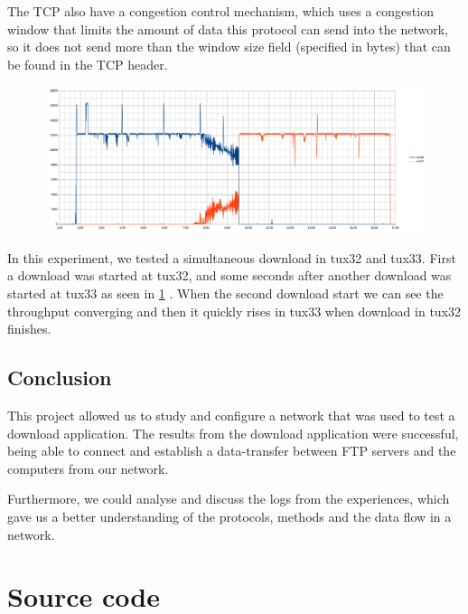 \documentclass[a4paper, 11pt]{report}
\begin{document}
The TCP also have a congestion control mechanism, which uses a congestion window that limits the amount of data this protocol can send into the network, 
so it does not send more than the window size field (specified in bytes) that can be found in the TCP header. 

\begin{figure}
    \includegraphics[width=\linewidth]{exp6_item5_hist.png}
    \caption{}
    \label{fig:exp6_item5}
\end{figure}

In this experiment, we tested a simultaneous download in tux32 and tux33. First a download was started at tux32, and some seconds after another download was started at tux33 as seen in \ref{fig:exp6_item5} .
When the second download start we can see the throughput converging and then it quickly rises in tux33 when download in tux32 finishes.

\section*{Conclusion} \label{sec:Conclusion}

This project allowed us to study and configure a network that was used to test a download application.
The results from the download application were successful, being able to connect and establish a data-transfer between FTP servers and the computers from our network. 

Furthermore, we could analyse and discuss the logs from the experiences, which gave us a better understanding of the protocols, methods and the data flow in a network.




\appendix
\appendixpage
\addappheadtotoc
\chapter{Source code}
\end{document}
